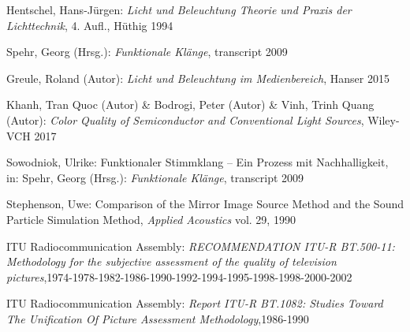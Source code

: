 \begin{thebibliography}{}
Hentschel, Hans-Jürgen: 
\emph{Licht und Beleuchtung Theorie und Praxis der Lichttechnik}, 4. Aufl., Hüthig 1994

Spehr, Georg (Hrsg.): 
\emph{Funktionale Klänge}, transcript 2009

Greule, Roland (Autor):
\emph{Licht und Beleuchtung im Medienbereich}, Hanser 2015 

Khanh, Tran Quoc (Autor) \& Bodrogi, Peter (Autor) \& Vinh, Trinh Quang (Autor):
\emph{Color Quality of Semiconductor and Conventional Light Sources}, Wiley-VCH 2017


Sowodniok, Ulrike: 
\glqq Funktionaler Stimmklang -- Ein Prozess mit Nachhalligkeit\grqq, 
in: Spehr, Georg (Hrsg.): \emph{Funktionale Klänge}, transcript 2009

Stephenson, Uwe: 
\glqq Comparison of the Mirror Image Source Method and the Sound Particle Simulation Method\grqq, 
\emph{Applied Acoustics} vol. 29, 1990

ITU Radiocommunication Assembly:
\emph{RECOMMENDATION ITU-R BT.500-11: Methodology for the subjective assessment of the quality of television pictures},1974-1978-1982-1986-1990-1992-1994-1995-1998-1998-2000-2002

ITU Radiocommunication Assembly:
\emph{Report ITU-R BT.1082: Studies Toward The Unification Of Picture Assessment Methodology},1986-1990

\end{thebibliography}

\clearpage\thispagestyle{empty}
\eigen  %












